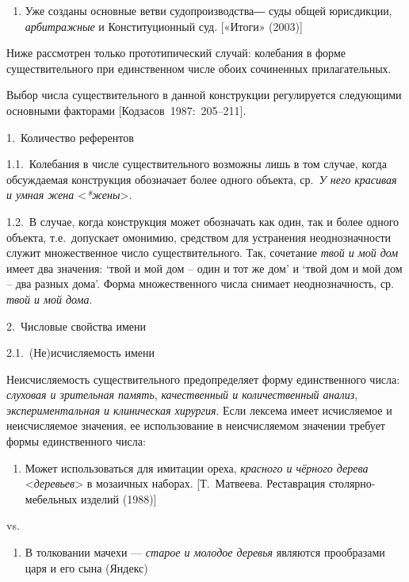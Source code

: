 \begin{enumerate}
\def\labelenumi{(\arabic{enumi})}
\setcounter{enumi}{142}
\item
  Уже созданы основные ветви судопроизводства― суды общей юрисдикции,
  \emph{арбитражные} и Конституционный суд. {[}«Итоги» (2003){]}
\end{enumerate}

Ниже рассмотрен только прототипический случай: колебания в форме
существительного при единственном числе обоих сочиненных прилагательных.

Выбор числа существительного в данной конструкции регулируется
следующими основными факторами {[}Кодзасов~1987:~205--211{]}.

1.~Количество референтов

1.1.~Колебания в числе существительного возможны лишь в том случае,
когда обсуждаемая конструкция обозначает более одного объекта,
ср.~\emph{У него} \emph{красивая и умная жена}
\textless{}\emph{*жены}\textgreater.

1.2.~В случае, когда конструкция может обозначать как один, так и более
одного объекта, т.е.~допускает омонимию, средством для устранения
неоднозначности служит множественное число существительного. Так,
сочетание \emph{твой и мой дом} имеет два значения: `твой и мой дом --
один и тот же дом' и `твой дом и мой дом -- два разных дома'. Форма
множественного числа снимает неоднозначность, ср. \emph{твой и мой
дома}.

2.~Числовые свойства имени

2.1.~(Не)исчисляемость имени

Неисчисляемость существительного предопределяет форму единственного
числа: \emph{слуховая и зрительная память}, \emph{качественный и
количественный анализ}, \emph{экспериментальная и клиническая хирургия}.
Если лексема имеет исчисляемое и неисчисляемое значения, ее
использование в неисчисляемом значении требует формы единственного
числа:

\begin{enumerate}
\def\labelenumi{(\arabic{enumi})}
\setcounter{enumi}{143}
\item
  Может использоваться для имитации ореха, \emph{красного и чёрного
  дерева} \textless*\emph{деревьев}\textgreater{} в мозаичных наборах.
  {[}Т.~Матвеева. Реставрация столярно-мебельных изделий (1988){]}
\end{enumerate}

vs.

\begin{enumerate}
\def\labelenumi{(\arabic{enumi})}
\setcounter{enumi}{144}
\item
  В толковании мачехи --- \emph{старое и молодое деревья} являются
  прообразами царя и его сына (Яндекс)
\end{enumerate}

